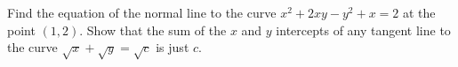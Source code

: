 \begin{questions}
\begin{multicols}{3}
    \end{multicols}
  \question Find the equation of the normal line to the curve $ x^2 + 2xy - y^2 + x = 2 $ at the point $ (1, 2) $.
  \question Show that the sum of the $ x $ and $ y $ intercepts of any tangent line to the curve $ \sqrt{x} + \sqrt{y} = \sqrt{c} $
            is just $ c $.
\end{questions}

